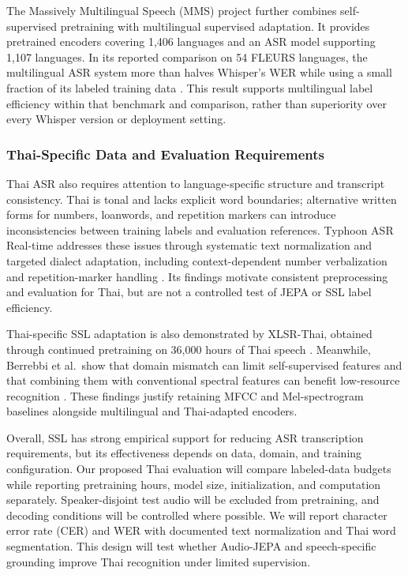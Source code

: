 \documentclass[conference]{IEEEtran}
\begin{document}
The Massively Multilingual Speech (MMS) project further combines self-supervised pretraining with multilingual supervised adaptation. It provides pretrained encoders covering 1,406 languages and an ASR model supporting 1,107 languages. In its reported comparison on 54 FLEURS languages, the multilingual ASR system more than halves Whisper's WER while using a small fraction of its labeled training data \cite{pratap2023mms}. This result supports multilingual label efficiency within that benchmark and comparison, rather than superiority over every Whisper version or deployment setting.

\subsubsection{Thai-Specific Data and Evaluation Requirements}
Thai ASR also requires attention to language-specific structure and transcript consistency. Thai is tonal and lacks explicit word boundaries; alternative written forms for numbers, loanwords, and repetition markers can introduce inconsistencies between training labels and evaluation references. Typhoon ASR Real-time addresses these issues through systematic text normalization and targeted dialect adaptation, including context-dependent number verbalization and repetition-marker handling \cite{sirichotedumrong2026typhoon}. Its findings motivate consistent preprocessing and evaluation for Thai, but are not a controlled test of JEPA or SSL label efficiency.

Thai-specific SSL adaptation is also demonstrated by XLSR-Thai, obtained through continued pretraining on 36,000 hours of Thai speech \cite{shao2025xlsrthai}. Meanwhile, Berrebbi et al.\ show that domain mismatch can limit self-supervised features and that combining them with conventional spectral features can benefit low-resource recognition \cite{berrebbi2022spectral}. These findings justify retaining MFCC and Mel-spectrogram baselines alongside multilingual and Thai-adapted encoders.

Overall, SSL has strong empirical support for reducing ASR transcription requirements, but its effectiveness depends on data, domain, and training configuration. Our proposed Thai evaluation will compare labeled-data budgets while reporting pretraining hours, model size, initialization, and computation separately. Speaker-disjoint test audio will be excluded from pretraining, and decoding conditions will be controlled where possible. We will report character error rate (CER) and WER with documented text normalization and Thai word segmentation. This design will test whether Audio-JEPA and speech-specific grounding improve Thai recognition under limited supervision.
\end{document}
